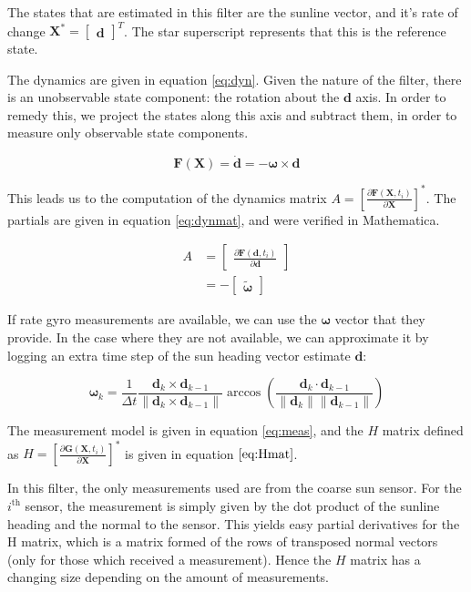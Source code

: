\documentclass[]{BasiliskReportMemo}
\begin{document}
The states that are estimated in this filter are the sunline vector, and it's rate of change $\bm X^* = \begin{bmatrix} \bm d\end{bmatrix}^T$. The star superscript represents that
this is the reference state. 

The dynamics are given in equation \ref{eq:dyn}. Given the nature of the filter, there is an unobservable state component: the rotation about the $\bm d$ axis. In order to remedy this, we project the states along this axis and subtract them, in order to measure only observable state components. 

\begin{equation}\label{eq:dyn}
\bm F(\bm X) =\dot{\bm d}  = - \bm \omega \times \bm d
\end{equation}

This leads us to the computation of the dynamics matrix $A = \left[\frac{\partial \bm F (\bm X, t_i)}{\partial \bm X}\right]^{*}$. The partials are given in equation \ref{eq:dynmat}, and were verified in Mathematica.

\begin{align}\label{eq:dynmat}
A&= \begin{bmatrix} \frac{\partial \bm F (\bm d, t_i)}{\partial \bm d}  \end{bmatrix} \\
&=  - \begin{bmatrix} \tilde{\bm \omega}\end{bmatrix} 
\end{align}

If rate gyro measurements are available, we can use the $\bm \omega$ vector that they provide. In the case where they are not available, we can approximate it by logging an extra time step of the sun heading vector estimate $\bm d$:

\begin{equation}
\bm \omega_k = \frac{1}{\Delta t} \frac{\bm d_k \times \bm d_{k-1}}{\|\bm d_k \times \bm d_{k-1} \|} \arccos\left( \frac{\bm d_k \cdot \bm d_{k-1}}{\|\bm d_k \| \| \bm d_{k-1}\|}\right) 
\end{equation}

The measurement model is given in equation \ref{eq:meas}, and the $H$ matrix defined as $H = \left[\frac{\partial \bm G (\bm X, t_i)}{\partial \bm X}\right]^{*}$ is given in equation $\ref{eq:Hmat}$. 

In this filter, the only measurements used are from the coarse sun sensor. For the $i^\mathrm{th}$ sensor, the measurement is simply given by the dot product of the sunline heading and the normal to the sensor. This yields easy partial derivatives for the H matrix, which is a matrix formed of the rows of transposed normal vectors (only for those which received a measurement). Hence the $H$ matrix has a changing size depending on the amount of measurements. 
\end{document}
